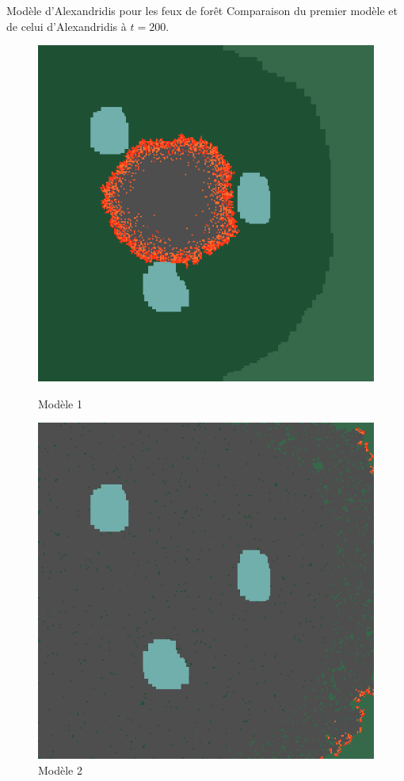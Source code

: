 \documentclass{beamer}
\begin{document}
\begin{frame}{Modèle d'Alexandridis pour les feux de forêt \hyperlink{jump}{\beamerbutton{ }} \hypertarget{10}{\beamerbutton{ }}}
    Comparaison du premier modèle et de celui d'Alexandridis à $t=200$.
    
    \begin{figure}[!htb]
        \begin{minipage}{0.48\textwidth}
          \centering
          \includegraphics[width=.8\linewidth]{pictures/model1/land_200.png}
          \caption{Modèle 1}\label{Fig:Data1}
        \end{minipage}\hfill
        \begin{minipage}{0.48\textwidth}
          \centering
          \includegraphics[width=.8\linewidth]{pictures/model2/land_200_nowind.png}
          \caption{Modèle 2}\label{Fig:Data2}
        \end{minipage}
     \end{figure}
\end{frame}
\end{document}
